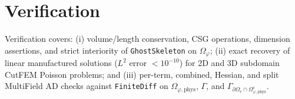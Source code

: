 \documentclass[11pt,a4paper]{article}
\begin{document}
\section{Verification}
Verification covers: (i) volume/length conservation, CSG operations, dimension assertions, and strict interiority of \texttt{GhostSkeleton} on $\Omega_\varphi$; (ii) exact recovery of linear manufactured solutions ($L^2$ error $< 10^{-10}$) for 2D and 3D subdomain CutFEM Poisson problems; and (iii) per-term, combined, Hessian, and split MultiField AD checks against \texttt{FiniteDiff} on $\Omega_{\varphi,\mathrm{phys}}$, $\Gamma$, and $\Gamma_{\partial \Omega_r \cap \Omega_{\varphi,\mathrm{phys}}^c}$.
\end{document}
